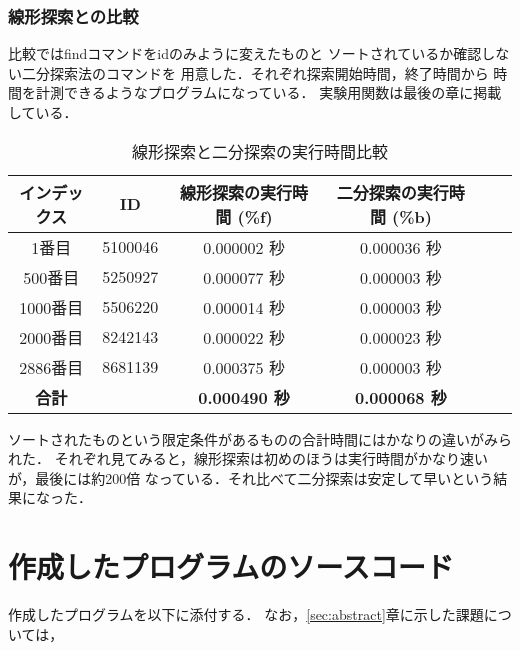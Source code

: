     \subsubsection{線形探索との比較}
    比較ではfindコマンドをidのみように変えたものと
    ソートされているか確認しない二分探索法のコマンドを
    用意した．それぞれ探索開始時間，終了時間から
    時間を計測できるようなプログラムになっている．
    実験用関数は最後の章に掲載している．
    \begin{table}[h]
      \centering
      \begin{tabular}{|c|c|c|c|c|c|}
      \hline
      インデックス & ID & 線形探索の実行時間 (\%f) & 二分探索の実行時間 (\%b) \\ \hline
      1番目 & 5100046 & 0.000002 秒 & 0.000036 秒  \\ \hline
      500番目 & 5250927 & 0.000077 秒 & 0.000003 秒   \\ \hline
      1000番目 & 5506220 & 0.000014 秒 & 0.000003 秒  \\ \hline
      2000番目 & 8242143 & 0.000022 秒 & 0.000023 秒  \\ \hline
      2886番目 & 8681139 & 0.000375 秒 & 0.000003 秒 \\ \hline
      \textbf{合計} & & \textbf{0.000490 秒} & \textbf{0.000068 秒}  \\ \hline
      \end{tabular}
      \caption{線形探索と二分探索の実行時間比較}
      \end{table}
  ソートされたものという限定条件があるものの合計時間にはかなりの違いがみられた．
  それぞれ見てみると，線形探索は初めのほうは実行時間がかなり速いが，最後には約200倍
  なっている．それ比べて二分探索は安定して早いという結果になった．


\section{作成したプログラムのソースコード}

作成したプログラムを以下に添付する．
なお，\ref{sec:abstract}章に示した課題については，


